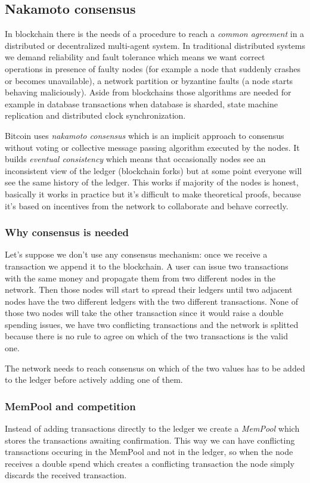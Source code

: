 \subsection{Nakamoto consensus}
In blockchain there is the needs of a procedure to reach a \emph{common agreement} in a distributed or decentralized multi-agent system.
In traditional distributed systems we demand reliability and fault tolerance which means we want correct operations in presence of faulty nodes (for example a node that suddenly crashes or becomes unavailable), a network partition or byzantine faults (a node starts behaving maliciously).
Aside from blockchains those algorithms are needed for example in database transactions when database is sharded, state machine replication and distributed clock synchronization.

Bitcoin uses \emph{nakamoto consensus} which is an implicit approach to consensus without voting or collective message passing algorithm executed by the nodes.
It builds \emph{eventual consistency} which means that occasionally nodes see an inconsistent view of the ledger (blockchain forks) but at some point everyone will see the same history of the ledger.
This works if majority of the nodes is honest, basically it works in practice but it's difficult to make theoretical proofs, because it's based on incentives from the network to collaborate and behave correctly.

\subsubsection{Why consensus is needed}
Let's suppose we don't use any consensus mechanism: once we receive a transaction we append it to the blockchain.
A user can issue two transactions with the same money and propagate them from two different nodes in the network.
Then those nodes will start to spread their ledgers until two adjacent nodes have the two different ledgers with the two different transactions.
None of those two nodes will take the other transaction since it would raise a double spending issues, we have two conflicting transactions and the network is splitted because there is no rule to agree on which of the two transactions is the valid one.

The network needs to reach consensus on which of the two values has to be added to the ledger before actively adding one of them.

\subsubsection{MemPool and competition}
Instead of adding transactions directly to the ledger we create a \emph{MemPool} which stores the transactions awaiting confirmation.
This way we can have conflicting transactions occuring in the MemPool and not in the ledger, so when the node receives a double spend which creates a conflicting transaction the node simply discards the received transaction.


